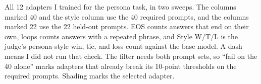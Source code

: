 \begin{table}[!t]
\centering
\caption{All 12 adapters I trained for the persona task, in two sweeps. The columns marked 40 and the style column use the 40 required prompts, and the columns marked 22 use the 22 held-out prompts. EOS counts answers that end on their own, loops counts answers with a repeated phrase, and Style W/T/L is the judge's persona-style win, tie, and loss count against the base model. A dash means I did not run that check. The filter needs both prompt sets, so ``fail on the 40 alone'' marks adapters that already break its 10-point thresholds on the required prompts. Shading marks the selected adapter.}
\label{tab:lorasweep}

\end{table}
